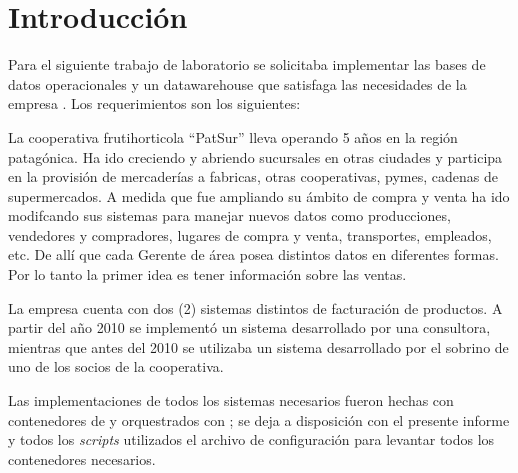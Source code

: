 







\clearpage
\tableofcontents
\clearpage 

\lstset{style=sql}

\section{Introducción}

Para el siguiente trabajo de laboratorio se solicitaba implementar las bases de datos operacionales y un datawarehouse que satisfaga las necesidades de la empresa . Los requerimientos son los siguientes:

\begin{displayquote}\itshape

La cooperativa frutihorticola “PatSur” lleva operando 5 años en la región patagónica. Ha ido creciendo y abriendo sucursales en otras ciudades y participa en la provisión de mercaderías a fabricas, otras cooperativas, pymes, cadenas de supermercados. A medida que fue ampliando su ámbito de compra y venta ha ido modifcando sus sistemas para manejar nuevos datos como producciones, vendedores y compradores, lugares de compra y venta, transportes, empleados, etc. De allí que cada Gerente de área posea distintos datos en diferentes formas. Por lo tanto la primer idea es tener información sobre las ventas. 

La empresa cuenta con dos (2) sistemas distintos de facturación de productos. A partir del año 2010 se implementó un sistema desarrollado por una consultora, mientras que antes del 2010 se utilizaba un sistema desarrollado por el sobrino de uno de los socios de la cooperativa.  

\end{displayquote}

Las implementaciones de todos los sistemas necesarios fueron hechas con contenedores de \docker{} y orquestrados con \doccom{}; se deja a disposición con el presente informe y todos los \emph{scripts} utilizados el archivo de configuración para levantar todos los contenedores necesarios. 

